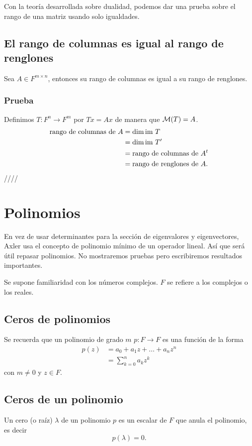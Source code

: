 \documentclass{article}
\begin{document}
Con la teoría desarrollada sobre dualidad, podemos dar una prueba
sobre el rango de una matriz usando solo igualdades.
\subsection{El rango de columnas es igual al rango de renglones}
Sea $A\in F^{m\times n}$, entonces su rango de columnas es
igual a su rango de renglones.
\subsubsection*{Prueba}
Definimos $T: F^n\rightarrow F^m$ por $Tx=Ax$ de manera que
$\mathcal{M}(T)=A$.
\begin{align*}
    \text{rango de columnas de $A$} &= \dim\text{im } T\\
    &= \dim\text{im } T'\\
    &= \text{rango de columnas de $A^t$}\\
    &= \text{rango de renglones de $A$}.
\end{align*}
\hfill ////
\newpage

\section{Polinomios}
En vez de usar determinantes para la sección de eigenvalores y
eigenvectores, Axler usa el concepto de polinomio mínimo de un
operador lineal. Así que será útil repasar polinomios.
No mostraremos pruebas pero escribiremos resultados importantes.

Se supone familiaridad con los números complejos. $F$ se
refiere a los complejos o los reales.

\subsection{Ceros de polinomios}
Se recuerda que un polinomio de grado $m$
$p:F\rightarrow F$ es una función de la forma
\begin{align*}
    p(z) &= a_0+a_1 z+\ldots+a_n z^n\\
    &= \sum^n_{k=0} a_k z^k
\end{align*}
con $m\neq 0$ y $z\in F$.

\subsection{Ceros de un polinomio}
Un cero (o raíz) $\lambda$ de un polinomio $p$ es un escalar de 
$F$ que anula el polinomio, es decir
$$p(\lambda) = 0.$$
\end{document}
